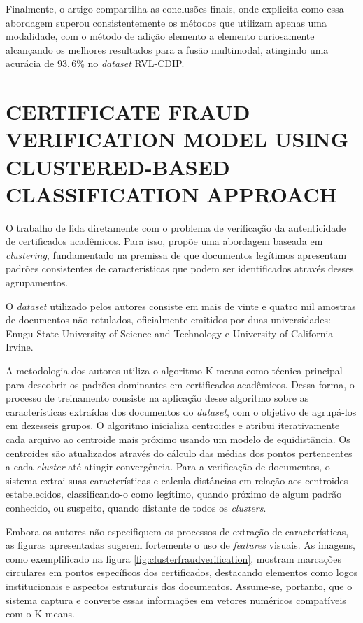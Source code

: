 Finalmente, o artigo compartilha as conclusões finais, onde explicita como essa abordagem superou consistentemente os métodos que utilizam apenas uma modalidade, com o método de adição elemento a elemento curiosamente alcançando os melhores resultados para a fusão multimodal, atingindo uma acurácia de $93,6$\% no \textit{dataset} RVL-CDIP.

\section{CERTIFICATE FRAUD VERIFICATION MODEL USING CLUSTERED-BASED CLASSIFICATION APPROACH}

O trabalho de \citeauthor*{clusterfraudverification} \cite*{clusterfraudverification} lida diretamente com o problema de verificação da autenticidade de certificados acadêmicos. Para isso, propõe uma abordagem baseada em \textit{clustering}, fundamentado na premissa de que documentos legítimos apresentam padrões consistentes de características que podem ser identificados através desses agrupamentos.

O \textit{dataset} utilizado pelos autores consiste em mais de vinte e quatro mil amostras de documentos não rotulados, oficialmente emitidos por duas universidades: Enugu State University of Science and Technology e University of California Irvine.

A metodologia dos autores utiliza o algoritmo K-means como técnica principal para descobrir os padrões dominantes em certificados acadêmicos. Dessa forma, o processo de treinamento consiste na aplicação desse algoritmo sobre as características extraídas dos documentos do \textit{dataset}, com o objetivo de agrupá-los em dezesseis grupos. O algoritmo inicializa centroides e atribui iterativamente cada arquivo ao centroide mais próximo usando um modelo de equidistância. Os centroides são atualizados através do cálculo das médias dos pontos pertencentes a cada \textit{cluster} até atingir convergência. Para a verificação de documentos, o sistema extrai suas características e calcula distâncias em relação aos centroides estabelecidos, classificando-o como legítimo, quando próximo de algum padrão conhecido, ou suspeito, quando distante de todos os \textit{clusters}.

Embora os autores não especifiquem os processos de extração de características, as figuras apresentadas sugerem fortemente o uso de \textit{features} visuais. As imagens, como exemplificado na figura \ref{fig:clusterfraudverification}, mostram marcações circulares em pontos específicos dos certificados, destacando elementos como logos institucionais e aspectos estruturais dos documentos. Assume-se, portanto, que o sistema captura e converte essas informações em vetores numéricos compatíveis com o K-means.

